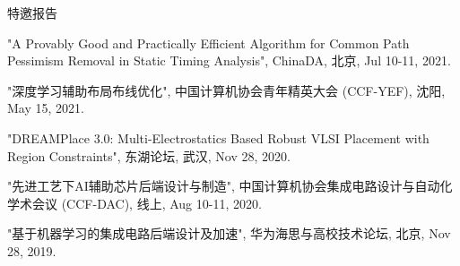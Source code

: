\begin{rSection}{特邀报告}
\begin{description}[font=\normalfont]
\item[{[T5]}]{
"A Provably Good and Practically Efficient Algorithm for Common Path Pessimism Removal in Static Timing Analysis", ChinaDA, 北京, Jul 10-11, 2021. 
}

\item[{[T4]}]{
"深度学习辅助布局布线优化", 中国计算机协会青年精英大会 (CCF-YEF), 沈阳, May 15, 2021. 
}

\item[{[T3]}]{
"DREAMPlace 3.0: Multi-Electrostatics Based Robust VLSI Placement with Region Constraints", 东湖论坛, 武汉, Nov 28, 2020.
}

\item[{[T2]}]{
"先进工艺下AI辅助芯片后端设计与制造", 中国计算机协会集成电路设计与自动化学术会议 (CCF-DAC), 线上, Aug 10-11, 2020. 
}

\item[{[T1]}]{
"基于机器学习的集成电路后端设计及加速", 华为海思与高校技术论坛, 北京, Nov 28, 2019. 
}

\end{description}
\end{rSection}
